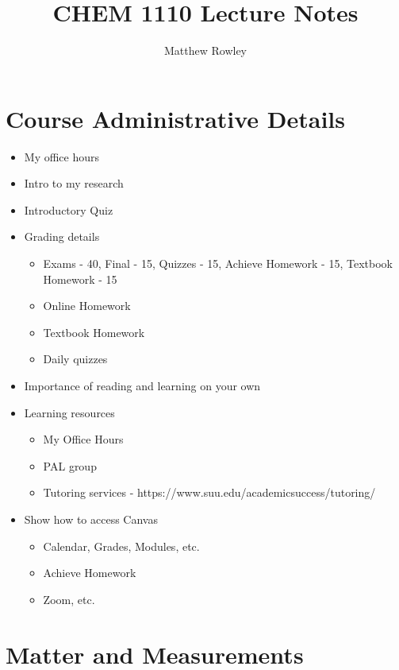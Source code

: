 \documentclass[12pt, openany, letterpaper]{memoir}
\begin{document}
\title{CHEM 1110 Lecture Notes}
\author{Matthew Rowley}
\mainmatter
\maketitle

\chapter*{Course Administrative Details}
\begin{itemize}
	\item My office hours
	\item Intro to my research
	\item Introductory Quiz
	\item Grading details
	\begin{itemize}
		\item Exams - 40, Final - 15, Quizzes - 15, Achieve Homework - 15, Textbook Homework - 15
		\item Online Homework
		\item Textbook Homework
		\item Daily quizzes
	\end{itemize}
	\item Importance of reading and learning on your own
	\item Learning resources
	\begin{itemize}
		\item My Office Hours
		\item PAL group
		\item Tutoring services - https://www.suu.edu/academicsuccess/tutoring/
	\end{itemize}
	\item Show how to access Canvas
	\begin{itemize}
		\item Calendar, Grades, Modules, etc.
		\item Achieve Homework
		\item Zoom, etc.
	\end{itemize}	
\end{itemize}

\chapter{Matter and Measurements}
\end{document}
